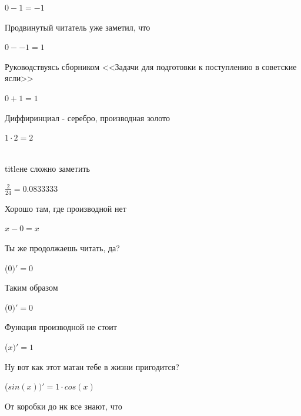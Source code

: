 \documentclass[12pt,a4paper,fleqn]{article}
\begin{document}
\begin{center}
\begin{center}
\begin{center}
\begin{center}
\begin{center}
\begin{center}
\begin{center}
\begin{center}
\begin{center}
\begin{center}
\begin{center}
\begin{center}
\begin{center}
\begin{center}
\begin{center}
\begin{center}
\begin{center}
\begin{center}
\begin{center}
\begin{center}
\begin{center}
\begin{center}
\begin{center}
\begin{center}
\begin{center}
\begin{center}
\begin{center}
\begin{center}
\begin{center}
\begin{center}
\begin{center}$0-1 = -1$\end{center}
Продвинутый читатель уже заметил, что

\begin{center}
\begin{center}$0--1 = 1$\end{center}
Руководствуясь сборником <<Задачи для подготовки к поступлению в советские ясли>>\cite{link1}

\begin{center}
\begin{center}$0+1 = 1$\end{center}
Диффиринциал - серебро, производная золото\cite{link2}

\begin{center}
\begin{center}$1 \cdot 2 = 2$\end{center}
\\ title{не сложно заметить} 

\begin{center}
\begin{center}$\frac{2}{24} = 0.0833333$\end{center}
Хорошо там, где производной нет\cite{link2}

\begin{center}
$x-0 = x$\end{center}
Ты же продолжаешь читать, да?

\begin{center}
 ($0)'
  = 0$\end{center}
Таким образом

\begin{center}
 ($0)'
  = 0$\end{center}
Функция производной не стоит\cite{link2}

\begin{center}
 ($x)'
  = 1$\end{center}
Ну вот как этот матан тебе в жизни пригодится?

\begin{center}
 ($sin(x))'
  = 1 \cdot cos(x)$\end{center}
От коробки до нк все знают, что


\end{center}
\end{center}
\end{center}
\end{center}
\end{center}
\end{center}
\end{center}
\end{center}
\end{center}
\end{center}
\end{center}
\end{center}
\end{center}
\end{center}
\end{center}
\end{center}
\end{center}
\end{center}
\end{center}
\end{center}
\end{center}
\end{center}
\end{center}
\end{center}
\end{center}
\end{center}
\end{center}
\end{center}
\end{center}
\end{center}
\end{center}
\end{center}
\end{center}
\end{center}
\end{document}
